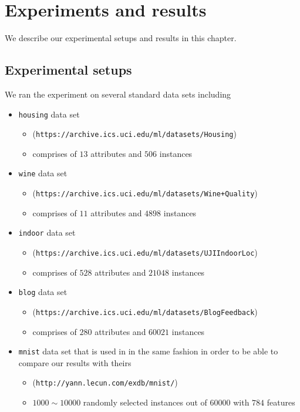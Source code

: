 \chapter{Experiments and results}
\label{chapter:results}
We describe our experimental setups and results in this chapter.

\section{Experimental setups}
\label{section:setup}
We ran the experiment on several standard data sets including 
\begin{itemize}
 \item \texttt{housing} data set
 \begin{itemize}
  \item (\texttt{https://archive.ics.uci.edu/ml/datasets/Housing})
  \item comprises of $13$ attributes and $506$ instances
 \end{itemize}
  \item \texttt{wine} data set
 \begin{itemize}
  \item (\texttt{https://archive.ics.uci.edu/ml/datasets/Wine+Quality})
  \item comprises of $11$ attributes and $4898$ instances
 \end{itemize}
 \item \texttt{indoor} data set
 \begin{itemize}
  \item (\texttt{https://archive.ics.uci.edu/ml/datasets/UJIIndoorLoc})
  \item comprises of $528$ attributes and $21048$ instances
 \end{itemize}
 \item \texttt{blog} data set
 \begin{itemize}
  \item (\texttt{https://archive.ics.uci.edu/ml/datasets/BlogFeedback})
  \item comprises of $280$ attributes and $60021$ instances
 \end{itemize}
 \item \texttt{mnist} data set that is used in \citealp{NIPS2012_4689} in the same fashion in order to be able to compare our results with theirs
 \begin{itemize}
  \item (\texttt{http://yann.lecun.com/exdb/mnist/})
  \item $1000\sim 10000$ randomly selected instances out of $60000$ with $784$ features
 \end{itemize}
\end{itemize}

